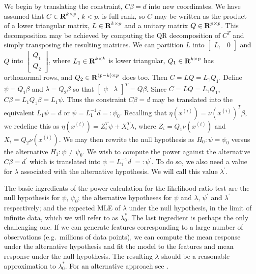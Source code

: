 \documentclass[12pt]{article}
\begin{document}
We begin by translating the constraint, $C\beta = d$ into new coordinates. We have assumed that $C \in {\mbox{\bf R}}^{k \times p}$, $k < p$, is full rank, so $C$ may be written as the product of a lower triangular matrix, $L \in {\mbox{\bf R}}^{k \times p}$ and a unitary matrix $Q \in {\mbox{\bf R}}^{p \times p}$. This decomposition may be achieved by computing the QR decomposition of $C^T$ and simply transposing the resulting matrices. We can partition $L$ into $\left[ \begin{array}{ll} L_1 & 0 \end{array}\right]$ and $Q$ into $\left[ \begin{array}{l} Q_1 \\ Q_2 \end{array} \right]$, where $L_1 \in {\mbox{\bf R}}^{k \times k}$ is lower triangular, $Q_1 \in {\mbox{\bf R}}^{k \times p}$ has orthonormal rows, and $Q_2 \in {\mbox{\bf R}}^{(p-k) \times p}$ does too. Then $C = LQ = L_1 Q_1$. Define $\psi = Q_1 \beta$ and $\lambda = Q_2 \beta$ so that $\left[ \begin{array}{ll} \psi & \lambda \end{array}\right]^T = Q \beta$. Since $C = LQ = L_1 Q_1$, $C \beta = L_1 Q_1 \beta = L_1 \psi$. Thus the constraint $C \beta = d$ may be translated into the equivalent $L_1 \psi = d$ or $\psi = L_1^{-1} d =: \psi_0$. Recalling that $\eta(x^{(i)}) = \nu(x^{(i)})^T \beta$, we redefine this as $\eta(x^{(i)}) = Z_i^T \psi + X_i^T \lambda$, where $Z_i = Q_1 \nu(x^{(i)})$ and $X_i = Q_2 \nu(x^{(i)})$. We may then rewrite the null hypothesis as $H_0: \psi = \psi_0$ versus the alternative $H_1: \psi \neq \psi_0$. We wish to compute the power against the alternative $C \beta = d^\prime$ which is translated into $\psi = L_1^{-1} d^\prime =: \psi^\prime$. To do so, we also need a value for $\lambda$ associated with the alternative hypothesis. We will call this value $\lambda^\prime$.

The basic ingredients of the power calculation for the likelihood ratio test are the null hypothesis for $\psi$, $\psi_0$; the alternative hypotheses for $\psi$ and $\lambda$, $\psi^\prime$ and $\lambda^\prime$ respectively; and the expected MLE of $\lambda$ under the null hypothesis, in the limit of infinite data, which we will refer to as $\lambda_0^*$. The last ingredient is perhaps the only challenging one. If we can generate features corresponding to a large number of observations (e.g.~millions of data points), we can compute the mean response under the alternative hypothesis and fit the model to the features and mean response under the null hypothesis. The resulting $\lambda$ should be a reasonable approximation to $\lambda_0^*$. For an alternative approach see \cite{SM:88}.
\end{document}
